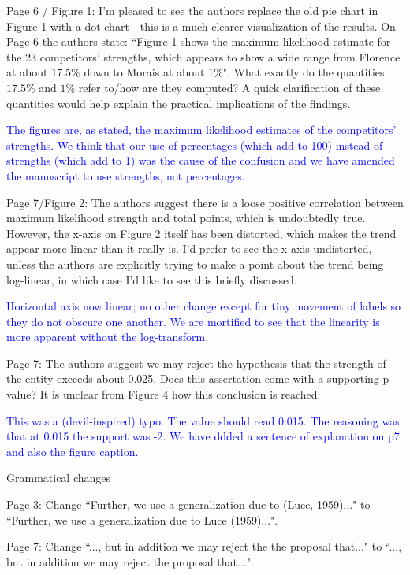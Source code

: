 \documentclass[12pt]{article}
\begin{document}
Page 6 / Figure 1: I'm pleased to see the authors replace the old pie
chart in Figure 1 with a dot chart---this is a much clearer
visualization of the results.  On Page 6 the authors state: ``Figure 1
shows the maximum likelihood estimate for the 23 competitors'
strengths, which appears to show a wide range from Florence at about
$17.5\%$ down to Morais at about $1\%$". What exactly do the
quantities $17.5\%$ and $1\%$ refer to/how are they computed? A quick
clarification of these quantities would help explain the practical
implications of the findings.

\textcolor{blue}{The figures are, as stated, the maximum likelihood
  estimates of the competitors' strengths.  We think that our use of
  percentages (which add to 100) instead of strengths (which add to 1)
  was the cause of the confusion and we have amended the manuscript to
  use strengths, not percentages.}

Page 7/Figure 2: The authors suggest there is a loose positive
correlation between maximum likelihood strength and total points,
which is undoubtedly true. However, the x-axis on Figure 2 itself has
been distorted, which makes the trend appear more linear than it
really is. I'd prefer to see the x-axis undistorted, unless the
authors are explicitly trying to make a point about the trend being
log-linear, in which case I'd like to see this briefly discussed.

\textcolor{blue}{Horizontal axis now linear; no other change except
  for tiny movement of labels so they do not obscure one another.  We
  are mortified to see that the linearity is more apparent without the
  log-transform.}

Page 7: The authors suggest we may reject the hypothesis that the
strength of the entity exceeds about 0.025. Does this assertation come
with a supporting p-value? It is unclear from Figure 4 how this
conclusion is reached.

\textcolor{blue}{This was a (devil-inspired) typo.  The value should
  read 0.015.  The reasoning was that at 0.015 the support was -2.  We
  have ddded a sentence of explanation on p7 and also the figure
  caption.}


Grammatical changes

Page 3: Change ``Further, we use a generalization due to (Luce,
1959)..." to ``Further, we use a generalization due to Luce
(1959)...".

Page 7: Change ``..., but in addition we may reject the
the proposal that..." to ``..., but in addition we may reject the
proposal that...".
\end{document}
